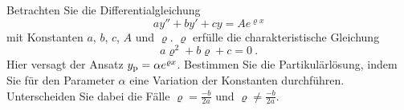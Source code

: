 \begin{atiTask}[
  title = Der Resonanzfall
]
  Betrachten Sie die Differentialgleichung
  \[
    ay'' + by' + cy = A e^{\varrho x}
  \]
  mit Konstanten $a$, $b$, $c$, $A$ und $\varrho$.
  $\varrho$ erfülle die charakteristische Gleichung
  \[
    a\varrho^2 + b \varrho + c = 0 \ .
  \]
  Hier versagt der Ansatz $y_{\mathrm{p}} = \alpha e^{\varrho x}$.
  Bestimmen Sie die Partikulärlösung, indem Sie für den Parameter $\alpha$ eine Variation der Konstanten durchführen.
  Unterscheiden Sie dabei die Fälle $\varrho = \frac{-b}{2a}$ und $\varrho \neq \frac{-b}{2a}$.
\end{atiTask}